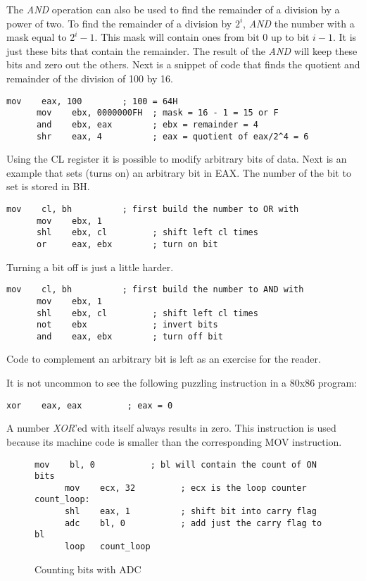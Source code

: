 The \emph{AND} operation can also be used to find the remainder of a
division by a power of two. To find the remainder of a division by
$2^i$, \emph{AND} the number with a mask equal to $2^i - 1$. This mask will
contain ones from bit 0 up to bit $i-1$. It is just these bits that contain
the remainder. The result of the \emph{AND} will keep these bits and
zero out the others. Next is a snippet of code that finds the quotient and
remainder of the division of 100 by 16.
\begin{lstlisting}[language={[x86masm]Assembler}]
      mov    eax, 100        ; 100 = 64H
      mov    ebx, 0000000FH  ; mask = 16 - 1 = 15 or F
      and    ebx, eax        ; ebx = remainder = 4
      shr    eax, 4          ; eax = quotient of eax/2^4 = 6
\end{lstlisting}
Using the {\code CL} register it is possible to modify arbitrary bits of data.
Next is an example that sets (turns on) an arbitrary bit in {\code EAX}. The
number of the bit to set is stored in {\code BH}.
\begin{lstlisting}[language={[x86masm]Assembler}]
      mov    cl, bh          ; first build the number to OR with
      mov    ebx, 1
      shl    ebx, cl         ; shift left cl times
      or     eax, ebx        ; turn on bit
\end{lstlisting}
Turning a bit off is just a little harder.
\begin{lstlisting}[language={[x86masm]Assembler}]
      mov    cl, bh          ; first build the number to AND with
      mov    ebx, 1
      shl    ebx, cl         ; shift left cl times
      not    ebx             ; invert bits
      and    eax, ebx        ; turn off bit
\end{lstlisting}
Code to complement an arbitrary bit is left as an exercise for the reader.

It is not uncommon to see the following puzzling instruction in a 80x86
program:
\begin{lstlisting}[language={[x86masm]Assembler},numbers=none]
      xor    eax, eax         ; eax = 0
\end{lstlisting}
A number \emph{XOR}'ed with itself always results in zero. This instruction
is used because its machine code is smaller than the corresponding 
{\code MOV} instruction.

\begin{figure}[t]
\begin{lstlisting}[language={[x86masm]Assembler}]
      mov    bl, 0           ; bl will contain the count of ON bits
      mov    ecx, 32         ; ecx is the loop counter
count_loop:
      shl    eax, 1          ; shift bit into carry flag
      adc    bl, 0           ; add just the carry flag to bl
      loop   count_loop
\end{lstlisting}
\caption{Counting bits with {\code ADC}\label{fig:countBitsAdc}}
\end{figure}

